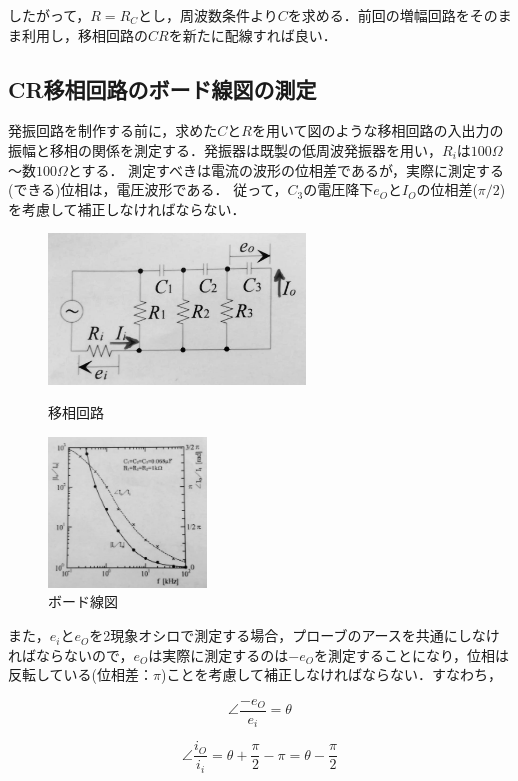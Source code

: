 \documentclass[10pt, a4j, dvipdfmx]{jarticle}
\begin{document}
    したがって，$R = R_C$とし，周波数条件より$C$を求める．前回の増幅回路をそのまま利用し，移相回路の$CR$を新たに配線すれば良い．

    \subsection*{CR移相回路のボード線図の測定}
    発振回路を制作する前に，求めた$C$と$R$を用いて図のような移相回路の入出力の振幅と移相の関係を測定する．発振器は既製の低周波発振器を用い，$R_i$は$100\Omega$〜数$100\Omega$とする．
    測定すべきは電流の波形の位相差であるが，実際に測定する(できる)位相は，電圧波形である．
    従って，$C_3$の電圧降下$e_O$と$I_O$の位相差($\pi/2$)を考慮して補正しなければならない．
    \begin{figure}[H]
        \begin{minipage}{0.5\hsize}
          \centering
          \includegraphics[height=40mm]{txt-2.jpg}
          \caption{移相回路}
        \end{minipage}
        \begin{minipage}{0.5\hsize}
          \centering
          \includegraphics[height=40mm]{txt-3.jpg}
          \caption{ボード線図}
        \end{minipage}
    \end{figure}
    また，$e_i$と$e_O$を2現象オシロで測定する場合，プローブのアースを共通にしなければならないので，$e_O$は実際に測定するのは$-e_O$を測定することになり，位相は反転している(位相差：$\pi$)ことを考慮して補正しなければならない．すなわち，
    \begin{figure}[H]
        \begin{minipage}{0.5\hsize}
            \begin{equation*}
                \angle \frac{-e_O}{e_i} = \theta
            \end{equation*}
        \end{minipage}
        \begin{minipage}{0.5\hsize}
            \begin{equation*}
                \angle \frac{i_O}{i_i} = \theta + \frac{\pi}{2} - \pi = \theta - \frac{\pi}{2}
            \end{equation*}
        \end{minipage}
      \end{figure}
\end{document}
